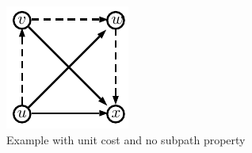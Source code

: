 \documentclass[letterpaper,11pt]{article}
\begin{document}
\begin{figure}
\caption{Example with unit cost and no subpath property}
\label{fig:nosubpath}
\centering
\includegraphics[scale=1.3]{TexImg/Nosubpath.pdf}
\end{figure}



\end{document}
